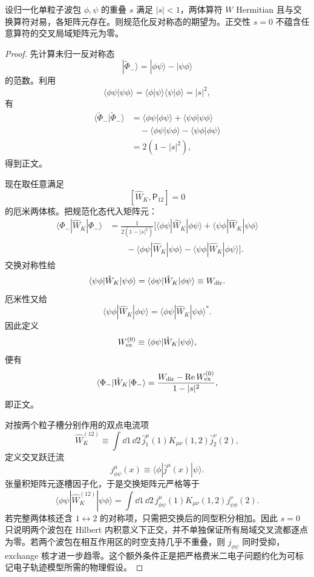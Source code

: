 \begin{proposition}[反对称双波包的直接与交换矩阵元]
设归一化单粒子波包 $\phi,\psi$ 的重叠 $s$ 满足 $|s|<1$，两体算符 $W$ Hermitian 且与交换算符对易，各矩阵元存在。则规范化反对称态的期望为。正交性 $s=0$ 不蕴含任意算符的交叉局域矩阵元为零。
\end{proposition}
\begin{proof}
先计算未归一反对称态
\[
|\widetilde\Phi_-\rangle
=
|\phi\psi\rangle-|\psi\phi\rangle
\]
的范数。利用
\[
\langle\phi\psi|\psi\phi\rangle
=
\langle\phi|\psi\rangle
\langle\psi|\phi\rangle
=
|s|^2,
\]
有
\begin{align*}
\langle\widetilde\Phi_-|\widetilde\Phi_-\rangle
&=
\langle\phi\psi|\phi\psi\rangle
+\langle\psi\phi|\psi\phi\rangle\\
&\quad-
\langle\phi\psi|\psi\phi\rangle
-\langle\psi\phi|\phi\psi\rangle\\
&=2(1-|s|^2),
\end{align*}
得到正文。

现在取任意满足
\[
[\hat W_K,\mathsf P_{12}]=0
\]
的厄米两体核。把规范化态代入矩阵元：
\begin{align*}
\langle\Phi_-|\hat W_K|\Phi_-\rangle
&=
\frac1{2(1-|s|^2)}
\Big[
\langle\phi\psi|\hat W_K|\phi\psi\rangle
+\langle\psi\phi|\hat W_K|\psi\phi\rangle\\
&\qquad
-\langle\phi\psi|\hat W_K|\psi\phi\rangle
-\langle\psi\phi|\hat W_K|\phi\psi\rangle
\Big].
\end{align*}
交换对称性给
\[
\langle\psi\phi|\hat W_K|\psi\phi\rangle
=
\langle\phi\psi|\hat W_K|\phi\psi\rangle
\equiv W_{\rm dir}.
\]
厄米性又给
\[
\langle\psi\phi|\hat W_K|\phi\psi\rangle
=
\langle\phi\psi|\hat W_K|\psi\phi\rangle^*.
\]
因此定义
\[
W_{\rm ex}^{(0)}
\equiv
\langle\phi\psi|\hat W_K|\psi\phi\rangle,
\]
便有
\[
\langle\Phi_-|\hat W_K|\Phi_-\rangle
=
\frac{
W_{\rm dir}-\operatorname{Re}W_{\rm ex}^{(0)}
}{
1-|s|^2},
\]
即正文。

对按两个粒子槽分别作用的双点电流项
\[
\hat W_K^{(12)}
\equiv
\int\dd1\,\dd2\,
\hat j_1^\mu(1)K_{\mu\nu}(1,2)\hat j_2^\nu(2),
\]
定义交叉跃迁流
\[
j_{\phi\psi}^{\mu}(x)
\equiv
\langle\phi|\hat j^\mu(x)|\psi\rangle.
\]
张量积矩阵元逐槽因子化，于是交换矩阵元严格等于
\[
\langle\phi\psi|\hat W_K^{(12)}|\psi\phi\rangle
=
\int\dd1\,\dd2\,
j_{\phi\psi}^{\mu}(1)
K_{\mu\nu}(1,2)
j_{\psi\phi}^{\nu}(2).
\]
若完整两体核还含 $1\leftrightarrow2$ 的对称项，只需把交换后的同型积分相加。因此 $s=0$ 只说明两个波包在 Hilbert 内积意义下正交，并不单独保证所有局域交叉流都逐点为零。若两个波包在相互作用区的时空支持几乎不重叠，则 $j_{\phi\psi}$ 同时受抑，exchange 核才进一步趋零。这个额外条件正是把严格费米二电子问题约化为可标记电子轨迹模型所需的物理假设。
\end{proof}


